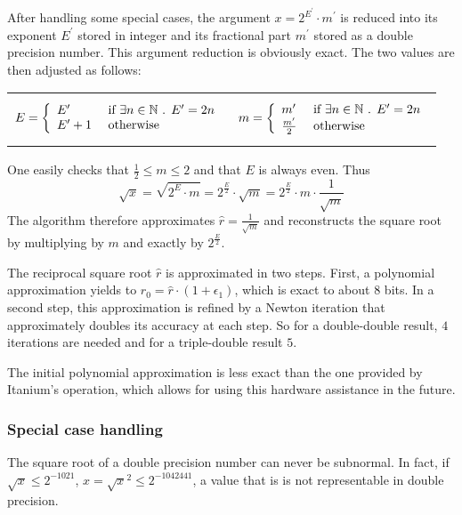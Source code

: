 After handling some special cases, the argument $x = 2^{E^\prime}
\cdot m^\prime$ is reduced into its exponent $E^\prime$ stored in
integer and its fractional part $m^\prime$ stored as a double
precision number.  This argument reduction is obviously exact. The two
values are then adjusted as follows:
\vspace{-3mm}
\begin{center}
  \begin{tabular}{cc}
    \begin{minipage}{60mm}
      $$E = \left \lbrace \begin{array}{ll} E^\prime & \mbox{ if } \exists n \in \mathbb {N} \mbox{ . } E^\prime = 2n\\
          E^\prime +1 & \mbox{ otherwise} \end{array} \right.$$
    \end{minipage}
    &
    \begin{minipage}{60mm}
      $$m = \left \lbrace \begin{array}{ll} m^\prime & \mbox{ if } \exists n \in \mathbb {N} \mbox{ . } E^\prime = 2n \\
          \frac{m^\prime}{2} & \mbox{ otherwise } \end{array} \right.$$
    \end{minipage}
  \end{tabular}
\end{center} 
One easily checks that $\frac{1}{2} \leq m \leq 2$ and that $E$ is always even. Thus
$$\sqrt{x} = \sqrt{2^E \cdot m} = 2^{\frac{E}{2}} \cdot \sqrt{m} =
2^{\frac{E}{2}} \cdot m \cdot \frac{1}{\sqrt{m}}$$ The algorithm
therefore approximates $\hat{r} = \frac{1}{\sqrt{m}}$ and reconstructs
the square root by multiplying by $m$ and exactly by
$2^{\frac{E}{2}}$.

The reciprocal square root $\hat{r}$ is approximated in two
steps. First, a polynomial approximation yields to $r_0 = \hat{r}
\cdot \left( 1 + \epsilon_1 \right)$, which is exact to about $8$
bits.  In a second step, this approximation is refined by a Newton
iteration that approximately doubles its accuracy at each step. So for
a double-double result, $4$ iterations are needed and for a
triple-double result $5$.

The initial polynomial approximation is less exact than the one
provided by Itanium's \texttt{} operation, which allows for using this
hardware assistance in the future.

\subsubsection{Special case handling}
The square root of a double precision number can never be
subnormal. In fact, if $\sqrt{x} \leq 2^{-1021}$, $x = \sqrt{x}^2 \leq
2^{-1042441}$, a value that is is not representable in double
precision. 

